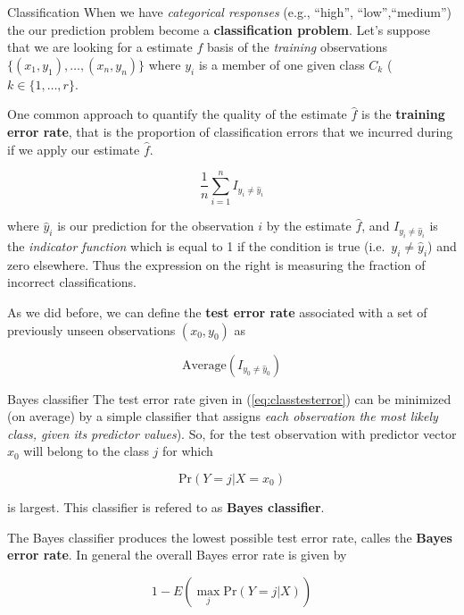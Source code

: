 \documentclass[
  ignorenonframetext,
]{beamer}
\begin{document}
\begin{frame}{Classification}
\label{classification}
When we have \emph{categorical responses} (e.g., ``high'',
``low'',``medium'') the our prediction problem become a
\textbf{classification problem}. Let's suppose that we are looking for a
estimate \(f\) basis of the \emph{training} observations
\(\{ (x_1,y_1), \ldots, (x_n,y_n)\}\) where \(y_i\) is a member of one
given class \(C_k\) (\(k\in \{1,\ldots,r\}\).

One common approach to quantify the quality of the estimate \(\hat{f}\)
is the \textbf{training error rate}, that is the proportion of
classification errors that we incurred during if we apply our estimate
\(\hat{f}\).

\begin{equation}
\frac{1}{n} \sum_{i=1}^n I_{y_i \ne \hat{y}_i}
\end{equation}

where \(\hat{y}_i\) is our prediction for the observation \(i\) by the
estimate \(\hat{f}\), and \(I_{y_i \ne \hat{y}_i}\) is the
\emph{indicator function} which is equal to 1 if the condition is true
(i.e.~\(y_i \ne \hat{y}_i\)) and zero elsewhere. Thus the expression on
the right is measuring the fraction of incorrect classifications.

As we did before, we can define the \textbf{test error rate} associated
with a set of previously unseen observations \((x_0,y_0)\) as

\begin{equation}
\mathrm{Average}(I_{y_0 \ne \hat{y}_0}) 
\label{eq:classtesterror}
\end{equation}

\begin{block}{Bayes classifier}
\label{bayes-classifier}
The test error rate given in (\ref{eq:classtesterror}) can be minimized
(on average) by a simple classifier that assigns \emph{each observation
the most likely class, given its predictor values}). So, for the test
observation with predictor vector \(x_0\) will belong to the class \(j\)
for which

\[
\mathrm{Pr}(Y=j | X=x_0)
\]

is largest. This classifier is refered to as \textbf{Bayes classifier}.

The Bayes classifier produces the lowest possible test error rate,
calles the \textbf{Bayes error rate}. In general the overall Bayes error
rate is given by

\[
1 - E \left( \max_{j} \mathrm{Pr}(Y=j|X) \right)
\]
\end{block}


\end{frame}
\end{document}
